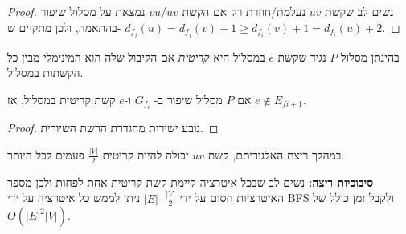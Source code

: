 \begin{proof}
נשים לב שקשת $uv$ נעלמת/חוזרת רק אם הקשת $uv$/$vu$ נמצאת על מסלול שיפור בהתאמה, 
ולכן מתקיים ש-
$d_{f_j}(u) = d_{f_j}(v) + 1 \geq d_{f_i}(v) + 1 = d_{f_i}(u) + 2$.
\end{proof}

\begin{definition}
בהינתן מסלול $P$ נגיד שקשת $e$ במסלול היא 
\emph{קריטית}
אם הקיבול שלה הוא המינימלי מבין כל הקשתות במסלול.
\end{definition}

\begin{claim}
אם $P$ מסלול שיפור ב-%
$G_{f_i}$
ו-$e$ קשת קריטית במסלול, אז 
$e \notin E_{f{i + 1}}$.
\end{claim}

\begin{proof}
נובע ישירות מהגדרת הרשת השיורית.
\end{proof}

\begin{corollary}
במהלך ריצת האלגוריתם, קשת
$uv$
יכולה להיות קריטית 
$\frac{|V|}{2}$
פעמים לכל היותר.

\end{corollary}

\textbf{סיבוכיות ריצה:}
נשים לב שבכל איטרציה קיימת קשת קריטית אחת לפחות ולכן מספר האיטרציות חסום על ידי
$|E| \cdot \frac{|V|}{2}$
ניתן לממש כל איטרציה על ידי BFS ולקבל זמן כולל של
$O(|E|^2|V|)$.

